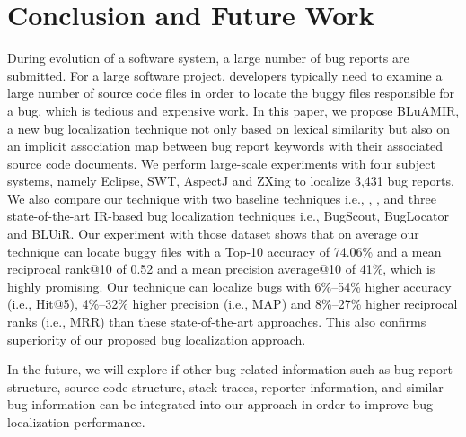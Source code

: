 \documentclass[sigconf,review,anonymous]{acmart}
\begin{document}
\section{Conclusion and Future Work} \label{sec:conclusionANDfuture}
During evolution of a software system, a large number of bug reports are submitted. For a large software project, developers typically need to examine a large number of source code files in order to locate the buggy files responsible for a bug, which is tedious and expensive work. In this paper, we propose BLuAMIR, a new bug localization technique not only based on lexical similarity but also on an implicit association map between bug report keywords with their associated source code documents. We perform large-scale experiments with four subject systems, namely Eclipse, SWT, AspectJ and ZXing to localize 3,431 bug reports.
We also compare our technique with two baseline techniques i.e., \cite{vector-space-model}, \cite{MarcusLSI}, and three state-of-the-art IR-based bug localization techniques i.e., BugScout\cite{Nguyen}, BugLocator\cite{Jian} and BLUiR\cite{Saha}.
Our experiment with those dataset shows that on average our technique can locate buggy files with a Top-10 accuracy of 74.06\% and a mean reciprocal rank@10 of 0.52 and a mean precision average@10 of 41\%, which is highly promising.   
Our technique can localize bugs with 6\%--54\% higher accuracy (i.e., Hit@5), 4\%--32\% higher precision (i.e., MAP) and 8\%--27\% higher reciprocal ranks (i.e., MRR) than these state-of-the-art approaches. This also confirms superiority of our proposed bug localization approach. 

In the future, we will explore if other bug related information such as bug report structure, source code structure, stack traces, reporter information, and similar bug information can be integrated into our approach in order to improve bug localization performance.

\balance


%


\end{document}
